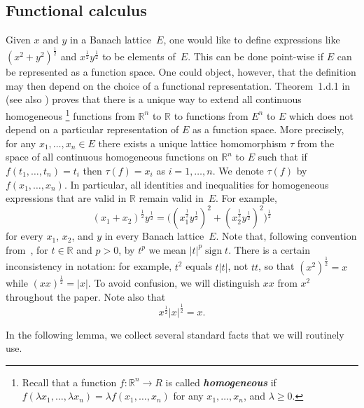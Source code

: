 \documentclass[12pt]{amsart}
\theoremstyle{plain}
\theoremstyle{definition}
\newcommand{\abs}[1]{\lvert#1\rvert}
\renewcommand{\ge}{\geqslant}
\newcommand{\term}[1]{{\textit{\textbf{#1}}}}
\def\xyroot{x^{\frac{1}{2}}{y^{\frac{1}{2}}}}
\DeclareMathOperator{\sign}{sign}
\begin{document}
\subsection{Functional calculus}
\label{FC}

Given $x$ and $y$ in a Banach lattice~$E$, one would like to
define expressions like $(x^2+y^2)^\frac{1}{2}$ and $\xyroot$ to be
elements of~$E$. This can be done point-wise if $E$ can be represented
as a function space. One could object, however, that the definition
may then depend on the choice of a functional representation.
Theorem~1.d.1 in~\cite{Lindenstrauss:79} (see also \cite{Buskes:91})
proves that there is a unique way to extend all continuous
homogeneous%
\footnote{Recall that a function $f\colon\mathbb R^n\to R$ is called
  \term{homogeneous} if $f(\lambda x_1,\dots,\lambda x_n)=\lambda
  f(x_1,\dots,x_n)$ for any $x_1,\dots,x_n$, and $\lambda\ge 0$.}
functions from $\mathbb R^n$ to $\mathbb R$ to functions from $E^n$ to
$E$ which does not depend on a particular representation of $E$ as a
function space. More precisely, for any $x_1,\dots,x_n\in E$ there
exists a unique lattice homomorphism $\tau$ from the space of all
continuous homogeneous functions on $\mathbb R^n$ to $E$ such that if
$f(t_1,\dots,t_n)=t_i$ then $\tau(f)=x_i$ as $i=1,\dots,n$. We denote
$\tau(f)$ by $f(x_1,\dots,x_n)$. In particular, all identities and
inequalities for homogeneous expressions that are valid in $\mathbb R$
remain valid in~$E$. For example,
\begin{equation}\label{distr}
 (x_1+x_2)^{\frac{1}{2}}y^{\frac{1}{2}}=
 \bigl((x_1^{\frac{1}{2}}y^{\frac{1}{2}})^2+
   (x_2^{\frac{1}{2}}y^{\frac{1}{2}})^2\bigr)^{\frac{1}{2}}
\end{equation}
for every $x_1$, $x_2$, and $y$ in every Banach lattice~$E$.  Note
that, following convention from~\cite[p.~53]{Lindenstrauss:79}, for
$t\in\mathbb R$ and $p>0$, by $t^p$ we mean $\abs{t}^p\sign t$. There
is a certain inconsistency in notation: for example, $t^2$ equals
$t\abs{t}$, not $tt$, so that $(x^2)^{\frac{1}{2}}=x$ while
$(xx)^{\frac{1}{2}}=\abs{x}$. To avoid confusion, we will distinguish
$xx$ from $x^2$ throughout the paper.  Note also that
\begin{equation}
  \label{sq-abs}
  x^{\frac{1}{2}}\abs{x}^{\frac{1}{2}}=x.
\end{equation}

In the following lemma, we collect several standard facts that we will
routinely use. 
\end{document}
